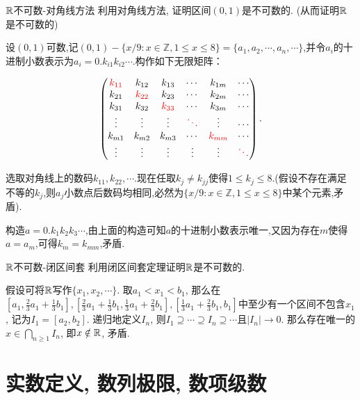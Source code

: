 \begin{exercise}{$\mathbb{R}$不可数-对角线方法}
	利用对角线方法, 证明区间$(0,1)$是不可数的. (从而证明$\mathbb{R}$是不可数的)
\end{exercise}
\begin{solution}
	设$(0,1)$可数,记$(0,1)-\{ x/9:x \in \mathbb{Z}, 1 \leq x \leq 8 \}=\{ a_1, a_2, \cdots ,a_n ,\cdots \}$,并令$a_i$的十进制小数表示为$a_i=0.k_{i1}k_{i2}\cdots$.构作如下无限矩阵：
	
	$$\begin{pmatrix}
 \color{red} k_{11} & k_{12} & k_{13} & \cdots & k_{1m} & \cdots \\
 k_{21} & \color{red} k_{22} & k_{23} & \cdots & k_{2m} & \cdots \\
 k_{31} & k_{32} & \color{red} k_{33} & \cdots & k_{3m} & \cdots \\
 \vdots & \vdots & \vdots & \color{red} \ddots & \vdots & \cdots \\
 k_{m1} & k_{m2} & k_{m3} & \cdots & \color{red} k_{mm} & \cdots \\
 \vdots & \vdots & \vdots & \vdots & \vdots & \color{red} \ddots
\end{pmatrix}.$$

	选取对角线上的数码$k_{11},k_{22},\cdots $.现在任取$k_j \neq k_{jj}$使得$1 \leq k_j \leq 8$.(假设不存在满足不等的$k_j$,则$a_j$小数点后数码均相同,必然为$\{ x/9:x \in \mathbb{Z}, 1 \leq x \leq 8 \}$中某个元素,矛盾).
	
	构造$a=0.k_1k_2k_3\cdots$,由上面的构造可知$a$的十进制小数表示唯一,又因为存在$m$使得$a=a_m$,可得$k_m=k_{mm}$,矛盾.
\end{solution}

\begin{exercise}{$\mathbb{R}$不可数-闭区间套}
	利用闭区间套定理证明$\mathbb{R}$是不可数的. 
\end{exercise}
\begin{solution}
	假设可将$\mathbb{R}$写作$\{ x_1,x_2,\cdots \}$. 取$a_1<x_1<b_1$, 那么在$[a_1, \frac{2}{3}a_1+\frac{1}{3}b_1], [\frac{2}{3}a_1+\frac{1}{3}b_1, \frac{1}{3}a_1+\frac{2}{3}b_1], [\frac{1}{3}a_1+\frac{2}{3}b_1 , b_1]$中至少有一个区间不包含$x_1$, 记为$I_1=[a_2,b_2]$. 递归地定义$I_n$, 则$I_1 \supseteq \cdots \supseteq I_n \supseteq \cdots$且$|I_n| \to 0$. 那么存在唯一的$x \in \bigcap_{n \geq 1}I_n$, 即$x \notin \mathbb{R}$, 矛盾. 
\end{solution}


\clearpage
\section{实数定义, 数列极限, 数项级数}

